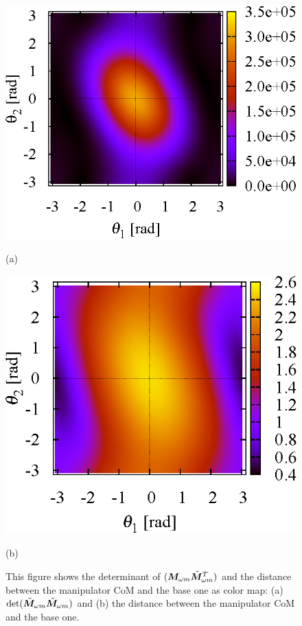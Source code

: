 %
\begin{figure}[t]
  \centering
  \begin{minipage}[t]{0.42\linewidth}
    \centering
    \includegraphics[width=1.0\linewidth]{fig/chapter3/planar/determinant.eps}
    \footnotesize\par{(a)}
  \end{minipage}
  \hspace{1mm}
  \begin{minipage}[t]{0.38\linewidth}
    \centering
    \includegraphics[width=1.0\linewidth]{fig/chapter3/planar/com.eps}
    \footnotesize\par{(b)}
  \end{minipage}
  \caption{This figure shows the determinant of $(\bm{M}_{\omega m}{\tilde{\bm{M}}}_{\omega m}^{T})$ and
  the distance between the manipulator CoM and the base one as color map:
  (a) $\mathrm{det}({\tilde{\bm{M}}}_{\omega m}{\tilde{\bm{M}}}_{\omega m})$ and (b) the distance between the manipulator CoM and the base one.}
  \label{fig:DET_FF2R}
\end{figure}
